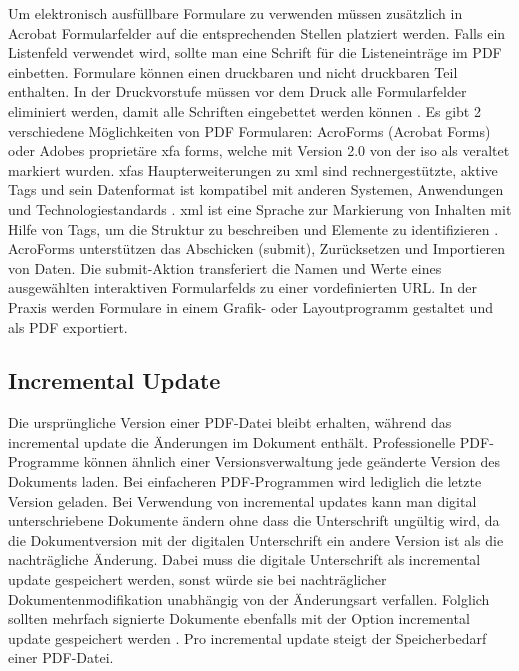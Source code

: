 Um elektronisch ausfüllbare Formulare zu verwenden müssen zusätzlich in Acrobat Formularfelder auf die entsprechenden Stellen platziert werden. Falls ein Listenfeld verwendet wird, sollte man eine Schrift für die Listeneinträge im PDF einbetten. Formulare können einen druckbaren und nicht druckbaren Teil enthalten. In der Druckvorstufe müssen vor dem Druck alle Formularfelder eliminiert werden, damit alle Schriften eingebettet werden können \cite{schneeberger}. Es gibt 2 verschiedene Möglichkeiten von PDF Formularen: AcroForms (Acrobat Forms) oder Adobes proprietäre \gls{xfa} forms, welche mit Version 2.0 von der \gls{iso} als veraltet markiert wurden. \gls{xfa}s Haupterweiterungen zu \gls{xml} sind rechnergestützte, aktive Tags und sein Datenformat ist kompatibel mit anderen Systemen, Anwendungen und Technologiestandards \cite{wiki-xfa}. \gls{xml} ist eine Sprache zur Markierung von Inhalten mit Hilfe von Tags, um die Struktur zu beschreiben und Elemente zu identifizieren \cite{schneeberger}. AcroForms unterstützen das Abschicken (submit), Zurücksetzen und Importieren von Daten. Die submit-Aktion transferiert die Namen und Werte eines ausgewählten interaktiven Formularfelds zu einer vordefinierten URL. In der Praxis werden Formulare in einem Grafik- oder Layoutprogramm gestaltet und als PDF exportiert.

\subsection{Incremental Update}
Die ursprüngliche Version einer PDF-Datei bleibt erhalten, während das incremental update die Änderungen im Dokument enthält. Professionelle PDF-Programme können ähnlich einer Versionsverwaltung jede geänderte Version des Dokuments laden. Bei einfacheren PDF-Programmen wird lediglich die letzte Version geladen. Bei Verwendung von incremental updates kann man digital unterschriebene Dokumente ändern ohne dass die Unterschrift ungültig wird, da die Dokumentversion mit der digitalen Unterschrift ein andere Version ist als die nachträgliche Änderung. Dabei muss die digitale Unterschrift als incremental update gespeichert werden, sonst würde sie bei nachträglicher Dokumentenmodifikation unabhängig von der Änderungsart verfallen. Folglich sollten mehrfach signierte Dokumente ebenfalls mit der Option incremental update gespeichert werden \cite{softx}. Pro incremental update steigt der Speicherbedarf einer PDF-Datei.

